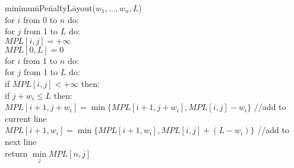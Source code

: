 \documentclass{article}
\begin{document}
\begin{enumerate}
\begin{tabbing}
min\= imu\= mPe\= nal\= tyL\= ayout($w_1,\ldots ,w_n,L$)\\
\>for $i$ from 0 to $n$ do:\\
\>\>for $j$ from 1 to $L$ do:\\
\>\>\>$MPL[i,j]=+\infty $\\
\>$MPL[0,L]=0$\\
\>for $i$ from 1 to $n$ do:\\
\>\>for $j$ from 1 to $L$ do:\\
\>\>\>if $MPL[i,j]<+\infty$ then:\\
\>\>\>\>if $j+w_i\le L$ then:\\
\>\>\>\>\>$MPL[i+1,j+w_i]=\min \{MPL[i+1,j+w_i],MPL[i,j]-w_i\}$ //add to current line\\
\>\>\>\>$MPL[i+1,w_i]=\min \{MPL[i+1,w_i],MPL[i,j]+(L-w_i)\}$ //add to next line\\
\>return $\min \limits_{j} MPL[n,j]$
\end{tabbing}
\end{enumerate}
\end{document}
